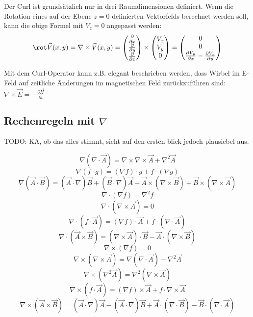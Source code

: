 Der Curl ist grundsätzlich nur in drei Raumdimensionen definiert.
Wenn die Rotation eines auf der Ebene $z=0$ definierten Vektorfelds berechnet werden soll, kann die obige Formel mit $V_z = 0$ angepasst werden:
\[
    \rot \vec{V}(x, y)
    = \nabla \times \vec{V}(x, y)
    =   \begin{pmatrix}
            \frac{\partial}{\partial x}\\
            \frac{\partial}{\partial y}\\
            \frac{\partial}{\partial z}
        \end{pmatrix} \times 
    \begin{pmatrix}
        V_x \\ V_y \\ 0
    \end{pmatrix} =
    \begin{pmatrix}
        0 \\
        0 \\
        \frac{\partial V_y}{\partial x} - \frac{\partial V_x}{\partial y}
    \end{pmatrix}
\]

\begin{outline}
    \1 Mit dem Curl-Operator kann z.B. elegant beschrieben werden, dass Wirbel im E-Feld auf zeitliche Änderungen im magnetischen Feld zurückzuführen sind:
        \2[] $\nabla \times \vec{E} = -\frac{\partial \vec{H}}{\partial t}$
\end{outline}

\subsection[Rechenregeln mit Nabla]{Rechenregeln mit $\nabla$}
TODO: KA, ob das alles stimmt, sieht auf den ersten blick jedoch plausiebel aus.

\[ \nabla(\nabla \cdot \vec{A}) = \nabla \times \nabla \times \vec{A} + \nabla^2 \vec{A}\]
\[ \nabla(f \cdot g) = (\nabla f) \cdot g + f \cdot (\nabla g) \]
\[ \nabla(\vec{A} \cdot \vec{B}) = (\vec{A} \cdot \nabla) \vec{B} + (\vec{B} \cdot \nabla) \vec{A} + \vec{A} \times (\nabla \times \vec{B}) + \vec{B} \times (\nabla \times \vec{A}) \]
\[ \nabla \cdot (\nabla f) = \nabla^2 f \]
\[ \nabla \cdot (\nabla \times \vec{A}) = 0 \]
\[ \nabla \cdot (f \cdot \vec{A}) = (\nabla f) \cdot \vec{A} + f \cdot (\nabla \cdot \vec{A}) \]
\[ \nabla \cdot (\vec{A} \times \vec{B}) = (\nabla \times \vec{A}) \cdot \vec{B} - \vec{A} \cdot (\nabla \times \vec{B}) \]
\[ \nabla \times (\nabla f) = 0 \]
\[ \nabla \times (\nabla \times \vec{A}) = \nabla (\nabla \cdot \vec{A}) - \nabla^2 \vec{A} \]
\[ \nabla \times (\nabla^2 \vec{A}) = \nabla^2 (\nabla \times \vec{A}) \]
\[ \nabla \times (f \cdot \vec{A}) = (\nabla f) \times \vec{A} + f \cdot \nabla \times \vec{A} \]
\[ \nabla \times (\vec{A} \times \vec{B}) = (\vec{A} \cdot \nabla) \vec{A} - (\vec{A} \cdot \nabla) \vec{B} + \vec{A} \cdot (\nabla \cdot \vec{B}) - \vec{B} \cdot (\nabla \cdot \vec{A}) \]

